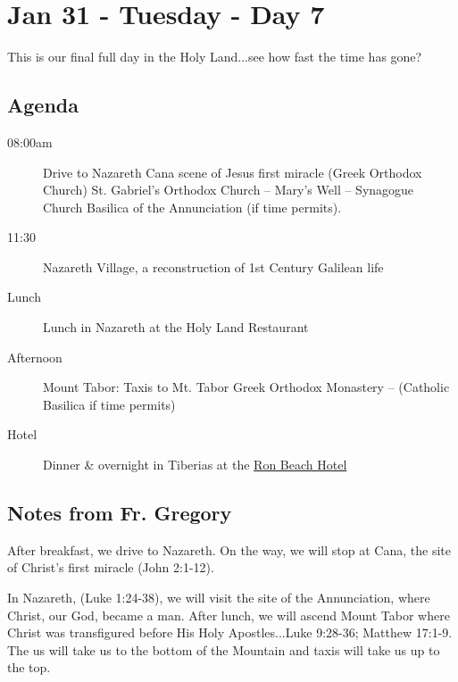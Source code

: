 \documentclass[letterpaper]{report}
\begin{document}

\clearpage

\clearpage
\section{Jan 31 - Tuesday - Day 7}
This is our final full day in the Holy Land...see how fast the time has gone?

\subsection{Agenda}
\begin{description}
	\item[08:00am] Drive to Nazareth Cana
	  \subitem scene of Jesus first miracle (Greek Orthodox Church)
	  \subitem St. Gabriel’s Orthodox Church – Mary’s Well – Synagogue Church 
	  \subitem Basilica of the Annunciation (if time permits).
	\item[11:30] Nazareth Village,
	    a reconstruction of 1st Century Galilean life
	\item[Lunch] Lunch in Nazareth at the Holy Land Restaurant
	\item[Afternoon] Mount Tabor: Taxis to Mt. Tabor 
	    \subitem Greek Orthodox Monastery – (Catholic Basilica if time permits)
	\item[Hotel] Dinner \& overnight in Tiberias at the   
	  \href{http://www.ronbeachhotel.com/}{Ron Beach Hotel}
\end{description}

\subsection{Notes from Fr. Gregory}
After breakfast, we drive to Nazareth.
On the way, we will stop at Cana, the site of Christ's first miracle
(John 2:1-12).

In Nazareth, (Luke 1:24-38), we will visit the site of the Annunciation,
where Christ, our God, became a man.
After lunch, we will ascend Mount Tabor where Christ was transfigured before
His Holy Apostles...Luke 9:28-36; Matthew 17:1-9. 
The us will take us to the bottom of the Mountain and taxis will take us up to
the top.
\end{document}
